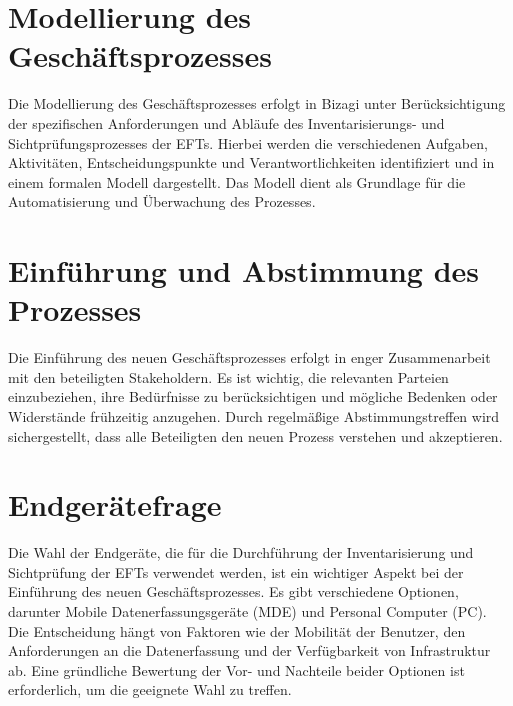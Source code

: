 \documentclass[12pt, a4paper]{article}
\begin{document}
\section{Modellierung des Geschäftsprozesses}

Die Modellierung des Geschäftsprozesses erfolgt in Bizagi unter Berücksichtigung der spezifischen Anforderungen und Abläufe des Inventarisierungs- und Sichtprüfungsprozesses der EFTs. Hierbei werden die 
verschiedenen Aufgaben, Aktivitäten, Entscheidungspunkte und Verantwortlichkeiten identifiziert und in einem formalen Modell dargestellt. Das Modell dient als Grundlage für die Automatisierung und Überwachung 
des Prozesses.

\section{Einführung und Abstimmung des Prozesses}

Die Einführung des neuen Geschäftsprozesses erfolgt in enger Zusammenarbeit mit den beteiligten Stakeholdern. Es ist wichtig, die relevanten Parteien einzubeziehen, ihre Bedürfnisse zu berücksichtigen und 
mögliche Bedenken oder Widerstände frühzeitig anzugehen. Durch regelmäßige Abstimmungstreffen wird sichergestellt, dass alle Beteiligten den neuen Prozess verstehen und akzeptieren.

\section{Endgerätefrage}

Die Wahl der Endgeräte, die für die Durchführung der Inventarisierung und Sichtprüfung der EFTs verwendet werden, ist ein wichtiger Aspekt bei der Einführung des neuen Geschäftsprozesses. Es gibt verschiedene 
Optionen, darunter Mobile Datenerfassungsgeräte (MDE) und Personal Computer (PC). Die Entscheidung hängt von Faktoren wie der Mobilität der Benutzer, den Anforderungen an die Datenerfassung und der Verfügbarkeit 
von Infrastruktur ab. Eine gründliche Bewertung der Vor- und Nachteile beider Optionen ist erforderlich, um die geeignete Wahl zu treffen.
\end{document}
